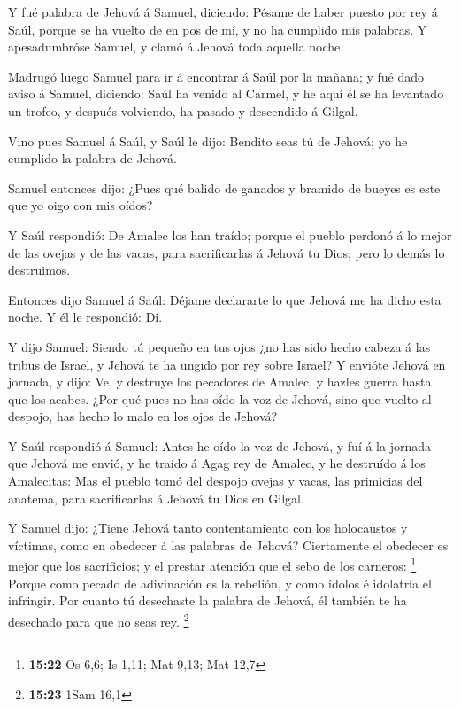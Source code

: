  Y fué palabra de Jehová á Samuel, diciendo: 
Pésame de haber puesto por rey á Saúl, porque se ha vuelto de en pos de
mí, y no ha cumplido mis palabras. Y apesadumbróse Samuel, y clamó á
Jehová toda aquella noche.

 Madrugó luego Samuel para ir á encontrar á Saúl por la
mañana; y fué dado aviso á Samuel, diciendo: Saúl ha venido al Carmel, y
he aquí él se ha levantado un trofeo, y después volviendo, ha pasado y
descendido á Gilgal.

 Vino pues Samuel á Saúl, y Saúl le dijo: Bendito seas tú
de Jehová; yo he cumplido la palabra de Jehová.

 Samuel entonces dijo: ¿Pues qué balido de ganados y
bramido de bueyes es este que yo oigo con mis oídos?

 Y Saúl respondió: De Amalec los han traído; porque el
pueblo perdonó á lo mejor de las ovejas y de las vacas, para
sacrificarlas á Jehová tu Dios; pero lo demás lo destruimos.

 Entonces dijo Samuel á Saúl: Déjame declararte lo que
Jehová me ha dicho esta noche. Y él le respondió: Di.

 Y dijo Samuel: Siendo tú pequeño en tus ojos ¿no has sido
hecho cabeza á las tribus de Israel, y Jehová te ha ungido por rey sobre
Israel?  Y envióte Jehová en jornada, y dijo: Ve, y
destruye los pecadores de Amalec, y hazles guerra hasta que los acabes.
 ¿Por qué pues no has oído la voz de Jehová, sino que
vuelto al despojo, has hecho lo malo en los ojos de Jehová?

 Y Saúl respondió á Samuel: Antes he oído la voz de Jehová,
y fuí á la jornada que Jehová me envió, y he traído á Agag rey de
Amalec, y he destruído á los Amalecitas:  Mas el pueblo
tomó del despojo ovejas y vacas, las primicias del anatema, para
sacrificarlas á Jehová tu Dios en Gilgal.

 Y Samuel dijo: ¿Tiene Jehová tanto contentamiento con los
holocaustos y víctimas, como en obedecer á las palabras de Jehová?
Ciertamente el obedecer es mejor que los sacrificios; y el prestar
atención que el sebo de los carneros: \footnote{\textbf{15:22} Os 6,6;
  Is 1,11; Mat 9,13; Mat 12,7}  Porque como pecado de
adivinación es la rebelión, y como ídolos é idolatría el infringir. Por
cuanto tú desechaste la palabra de Jehová, él también te ha desechado
para que no seas rey. \footnote{\textbf{15:23} 1Sam 16,1}

